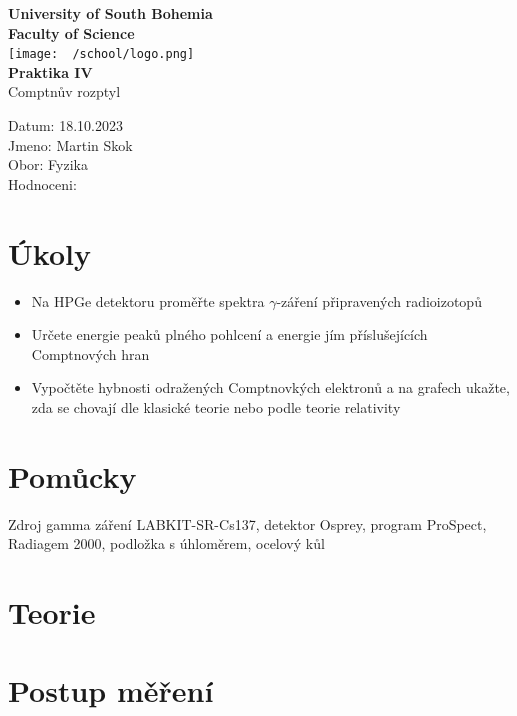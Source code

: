 \documentclass{article}
\begin{document}
\begin{center}
\textbf{\Huge{University of South Bohemia}}\\
\vspace{50px}
\textbf{\Large{Faculty of Science}} \\
\vspace{30px}
\texttt{[image: ~/school/logo.png]} \\
\vspace{30px}
\textbf{\large{Praktika IV}}
\vspace{20px}
\\
\vspace{20px}
\large{Comptnův rozptyl} \\
\vspace{60px}
\end{center}
\begin{flushleft}
Datum: 18.10.2023 \\
Jmeno: Martin Skok \\
Obor: Fyzika \\
Hodnoceni:
\end{flushleft}
\newpage
\section{Úkoly}
\begin{itemize}
  \item Na HPGe detektoru proměřte spektra $\gamma$-záření připravených radioizotopů
  \item Určete energie peaků plného pohlcení a energie jím příslušejících Comptnových hran
  \item Vypočtěte hybnosti odražených Comptnovkých elektronů a na grafech ukažte,
        zda se chovají dle klasické teorie nebo podle teorie relativity
\end{itemize}
\section{Pomůcky}
Zdroj gamma záření LABKIT-SR-Cs137, detektor Osprey, program ProSpect, Radiagem
2000, podložka s úhloměrem, ocelový kůl
\section{Teorie}
\section{Postup měření}
\end{document}
